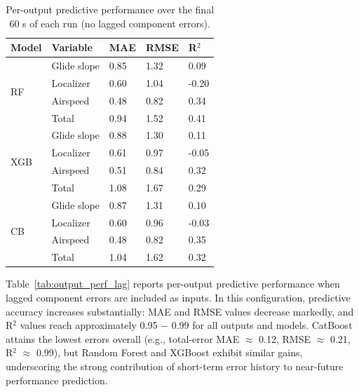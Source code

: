 \documentclass[11pt, a4paper]{article}
\begin{document}
\begin{table}[htbp]
	\caption{Per-output predictive performance over the final 60 s of each run (no lagged component errors).}
	\label{tab:output_perf_no_lag}
	\centering
	\small
	\begin{tabular}{lllll}
		\toprule                                 	
		Model 	&Variable    & MAE      &  RMSE      &R$^2$ \\ 
		\midrule
		\multirow{4}{*}{RF} 		&Glide slope  	& 0.85 	 & 1.32  & 0.09	\\
									&Localizer			& 0.60	& 1.04	& -0.20 \\
									&Airspeed				& 0.48	& 0.82	& 0.34	\\
									&Total				&0.94	&1.52	&0.41	\\
									 
									   	    	
									
		\midrule
		\multirow{4}{*}{XGB} 		&Glide slope   &0.88  & 1.30 	& 0.11 \\
									&Localizer			&0.61 & 0.97 	& -0.05 \\
									&Airspeed				&0.51	& 0.84 	& 0.32  \\
									&Total				&1.08	 &1.67	 &0.29  \\
									     	  	
									
									
		\midrule 
		\multirow{4}{*}{CB} 		&Glide slope   & 0.87	 & 1.31	  	& 0.10	\\
									&Localizer     	& 0.60  & 0.96		& -0.03	\\
									&Airspeed				& 0.48 	& 0.82		& 0.35	\\
									&Total			&1.04	&1.62		&0.32	\\			
		\bottomrule
	\end{tabular}
\end{table}

Table~\ref{tab:output_perf_lag} reports per-output predictive performance when lagged component errors are included as inputs. In this configuration, predictive accuracy increases substantially: MAE and RMSE values decrease markedly, and R$^2$ values reach approximately 0.95 $-$ 0.99 for all outputs and models. CatBoost attains the lowest errors overall (e.g., total-error MAE $\approx$ 0.12, RMSE $\approx$ 0.21, R$^2$ $\approx$ 0.99), but Random Forest and XGBoost exhibit similar gains, underscoring the strong contribution of short-term error history to near-future performance prediction.
\end{document}

